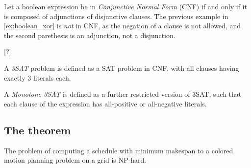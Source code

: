 Let a boolean expression be in \emph{Conjunctive Normal Form} (CNF) if and only if it is composed of adjunctions of disjunctive clauses. The previous example in \cref{ex:boolean_xor} is \emph{not} in CNF, as the negation of a clause is not allowed, and the second parethesis is an adjunction, not a disjunction.

 [?]


\begin{definition}
	A \emph{3SAT} problem is defined as a SAT problem in CNF, with all clauses having exactly 3 literals each.
\end{definition}

\begin{definition}
	A \emph{Monotone 3SAT} is defined as a further restricted version of 3SAT, such that each clause of the expression has all-positive or all-negative literals.
\end{definition}



\subsection{The theorem}

\begin{theorem}
	The problem of computing a schedule with minimum makespan to a colored motion planning problem on a grid is NP-hard.
\end{theorem}

